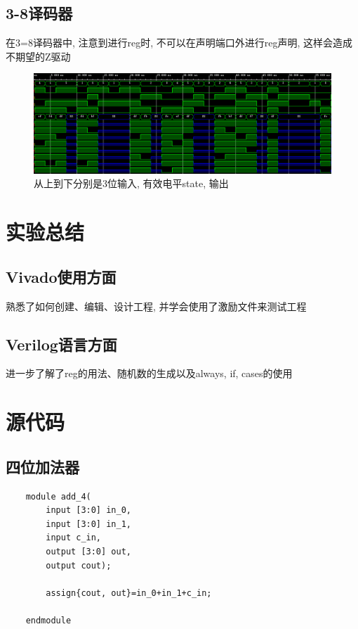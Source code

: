 \documentclass[fontset=windows,12pt]{article}
\begin{document}
    \subsection{3-8译码器}
        在3=8译码器中, 注意到进行reg时, 不可以在声明端口外进行reg声明, 这样会造成不期望的Z驱动
        \begin{figure}[ht]
            \centering
            \includegraphics[width=1\textwidth]{decoder.jpg}
            \caption{从上到下分别是3位输入, 有效电平state, 输出}
            \label{3to8decoder}
        \end{figure}\par

\section{实验总结}
    \subsection{Vivado使用方面}
        熟悉了如何创建、编辑、设计工程, 并学会使用了激励文件来测试工程
    \subsection{Verilog语言方面}
        进一步了解了reg的用法、随机数的生成以及always, if, cases的使用

\section{源代码}
    \subsection{四位加法器}
    {\setmainfont{Courier New Bold}                          %
    \begin{lstlisting}
    module add_4(
        input [3:0] in_0,
        input [3:0] in_1,
        input c_in,
        output [3:0] out,
        output cout);
        
        assign{cout, out}=in_0+in_1+c_in;
        
    endmodule
    \end{lstlisting}}
\end{document}
